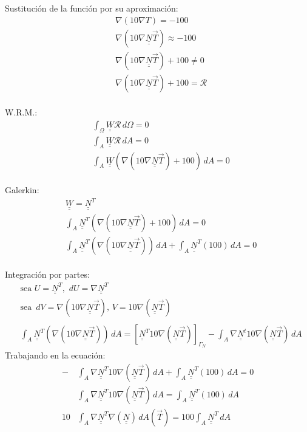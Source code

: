 \documentclass[10pt]{article}
\def\doubleunderline#1{\underline{\underline{#1}}}
\begin{document}
Sustituci\'on de la funci\'on por su aproximaci\'on: \\
\begin{align*}
& \nabla (10 \nabla T) = -100 \\
& \nabla (10 \nabla \doubleunderline{N} \vec{T})  \approx -100 \\
& \nabla (10 \nabla \doubleunderline{N} \vec{T}) + 100  \neq 0 \\
& \nabla (10 \nabla \doubleunderline{N} \vec{T}) + 100  = \mathscr{R}
\end{align*}\\
W.R.M.: \\
\begin{align*}
&\int_\Omega \doubleunderline{W} \mathscr{R} \,d \Omega  = 0 \\
&\int_A \doubleunderline{W} \mathscr{R} \,d A  = 0 \\
&\int_A \doubleunderline{W} (\nabla (10 \nabla \doubleunderline{N} \vec{T}) + 100) \,d A  = 0 
\end{align*} \\
Galerkin: \\
\begin{align*}
&\doubleunderline{W}  = \doubleunderline{N}^T \\
&\int_A \doubleunderline{N}^T (\nabla (10 \nabla \doubleunderline{N} \vec{T}) + 100) \,d A  = 0  \\
&\int_A \doubleunderline{N}^T (\nabla (10 \nabla \doubleunderline{N} \vec{T})) \,d A + \int_A \doubleunderline{N}^T (100) \,d A  = 0 
\end{align*}\\
Integraci\'on por partes: \\
\begin{align*}
& \text{sea } U = \doubleunderline{N}^T \text{, } \,d U =\nabla \doubleunderline{N}^T \\
& \text{sea } \,d V =\nabla (10 \nabla \doubleunderline{N}  \vec{T}) \text{, } V = 10 \nabla (\doubleunderline{N} \vec{T}) \\ \\
&\int_A \doubleunderline{N}^T (\nabla (10 \nabla \doubleunderline{N} \vec{T})) \,d A = [ \doubleunderline{N}^T 10 \nabla (\doubleunderline{N} \vec{T}) ]_{\Gamma_{N}} - \int_A \nabla \doubleunderline{N}^t 10 \nabla (\doubleunderline{N} \vec{T} ) \,d A
\end{align*}
\newpage
Trabajando en la ecuaci\'on: \\
\begin{align*}
 - &\int_A \nabla \doubleunderline{N}^T 10 \nabla (\doubleunderline{N} \vec{T} ) \,d A + \int_A \doubleunderline{N}^T (100) \,d A  = 0 \\
& \int_A \nabla \doubleunderline{N}^T 10 \nabla (\doubleunderline{N} \vec{T} ) \,d A = \int_A \doubleunderline{N}^T (100) \,d A \\
 10 &\int_A \nabla \doubleunderline{N}^T \nabla (\doubleunderline{N} ) \,d A (\vec{T}) = 100 \int_A \doubleunderline{N}^T \,d A
\end{align*}\\
\end{document}
